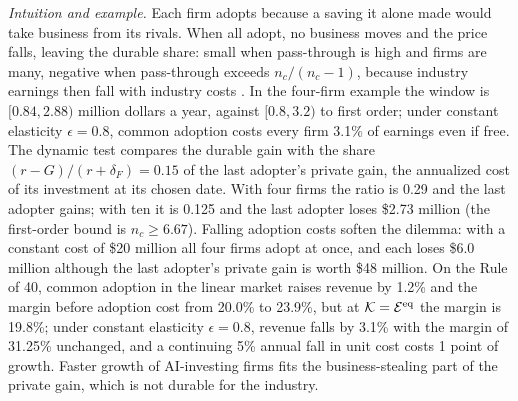 \begin{proposition}
\begin{enumerate}
\end{enumerate}
\end{proposition}

\noindent\emph{Intuition and example.} Each firm adopts because a saving it alone made would take business from its rivals. When all adopt, no business moves and the price falls, leaving the durable share: small when pass-through is high and firms are many, negative when pass-through exceeds $n_c/(n_c-1)$, because industry earnings then fall with industry costs \citep{weyl2013pass}. In the four-firm example the window is $[0.84,2.88)$ million dollars a year, against $[0.8,3.2)$ to first order; under constant elasticity $\epsilon=0.8$, common adoption costs every firm 3.1\% of earnings even if free. The dynamic test compares the durable gain with the share $(r-G)/(r+\delta_F)=0.15$ of the last adopter's private gain, the annualized cost of its investment at its chosen date. With four firms the ratio is 0.29 and the last adopter gains; with ten it is 0.125 and the last adopter loses \$2.73 million (the first-order bound is $n_c\ge6.67$). Falling adoption costs soften the dilemma: with a constant cost of \$20 million all four firms adopt at once, and each loses \$6.0 million although the last adopter's private gain is worth \$48 million. On the Rule of 40, common adoption in the linear market raises revenue by 1.2\% and the margin before adoption cost from 20.0\% to 23.9\%, but at $\mathcal K=\mathcal E^{\rm eq}$ the margin is 19.8\%; under constant elasticity $\epsilon=0.8$, revenue falls by 3.1\% with the margin of 31.25\% unchanged, and a continuing 5\% annual fall in unit cost costs 1 point of growth. Faster growth of AI-investing firms \citep{babina2024artificial} fits the business-stealing part of the private gain, which is not durable for the industry.

